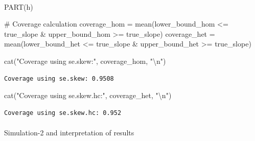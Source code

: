 \documentclass[
  11pt,
]{article}
\makeatletter
\let\oldparagraph\paragraph
\renewcommand{\paragraph}{
    \@ifstar
      \xxxParagraphStar
      \xxxParagraphNoStar
  }
\newcommand{\xxxParagraphStar}[1]{\oldparagraph*{#1}\mbox{}}
\newcommand{\xxxParagraphNoStar}[1]{\oldparagraph{#1}\mbox{}}
\newenvironment{Shaded}{\begin{snugshade}}{\end{snugshade}}
\newcommand{\CommentTok}[1]{\textcolor[rgb]{0.37,0.37,0.37}{#1}}
\newcommand{\FunctionTok}[1]{\textcolor[rgb]{0.28,0.35,0.67}{#1}}
\newcommand{\NormalTok}[1]{\textcolor[rgb]{0.00,0.23,0.31}{#1}}
\newcommand{\OtherTok}[1]{\textcolor[rgb]{0.00,0.23,0.31}{#1}}
\newcommand{\SpecialCharTok}[1]{\textcolor[rgb]{0.37,0.37,0.37}{#1}}
\newcommand{\StringTok}[1]{\textcolor[rgb]{0.13,0.47,0.30}{#1}}
\makeatother
\begin{document}
\paragraph{PART(h)}\label{parth}

\begin{Shaded}
\begin{Highlighting}[]
\CommentTok{\# Coverage calculation}
\NormalTok{coverage\_hom }\OtherTok{=} \FunctionTok{mean}\NormalTok{(lower\_bound\_hom }\SpecialCharTok{\textless{}=}\NormalTok{ true\_slope }\SpecialCharTok{\&}\NormalTok{ upper\_bound\_hom }\SpecialCharTok{\textgreater{}=}\NormalTok{ true\_slope)}
\NormalTok{coverage\_het }\OtherTok{=} \FunctionTok{mean}\NormalTok{(lower\_bound\_het }\SpecialCharTok{\textless{}=}\NormalTok{ true\_slope }\SpecialCharTok{\&}\NormalTok{ upper\_bound\_het }\SpecialCharTok{\textgreater{}=}\NormalTok{ true\_slope)}

\FunctionTok{cat}\NormalTok{(}\StringTok{"Coverage using se.skew:"}\NormalTok{, coverage\_hom, }\StringTok{"}\SpecialCharTok{\textbackslash{}n}\StringTok{"}\NormalTok{)}
\end{Highlighting}
\end{Shaded}

\begin{verbatim}
Coverage using se.skew: 0.9508 
\end{verbatim}

\begin{Shaded}
\begin{Highlighting}[]
\FunctionTok{cat}\NormalTok{(}\StringTok{"Coverage using se.skew.hc:"}\NormalTok{, coverage\_het, }\StringTok{"}\SpecialCharTok{\textbackslash{}n}\StringTok{"}\NormalTok{)}
\end{Highlighting}
\end{Shaded}

\begin{verbatim}
Coverage using se.skew.hc: 0.952 
\end{verbatim}

\paragraph{Simulation-2 and interpretation of
results}\label{simulation-2-and-interpretation-of-results}
\end{document}

